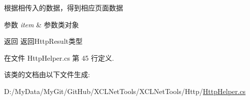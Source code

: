 根据相传入的数据，得到相应页面数据 


\begin{DoxyParams}{参数}
{\em item} & 参数类对象\\
\hline
\end{DoxyParams}
\begin{DoxyReturn}{返回}
返回\-Http\-Result类型
\end{DoxyReturn}


在文件 Http\-Helper.\-cs 第 45 行定义.



该类的文档由以下文件生成\-:\begin{DoxyCompactItemize}
\item 
D\-:/\-My\-Data/\-My\-Git/\-Git\-Hub/\-X\-C\-L\-Net\-Tools/\-X\-C\-L\-Net\-Tools/\-Http/\hyperlink{_http_helper_8cs}{Http\-Helper.\-cs}\end{DoxyCompactItemize}
